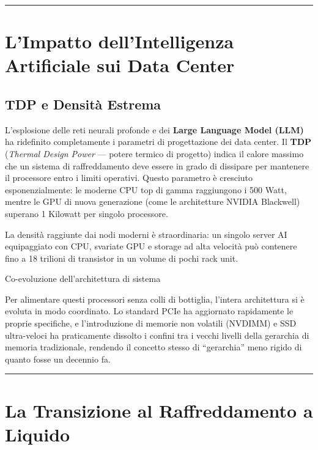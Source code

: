 \documentclass[
  italian,
  openany]{book}
\begin{document}
\begin{center}\rule{0.5\linewidth}{0.5pt}\end{center}

\section{L'Impatto dell'Intelligenza Artificiale sui Data
Center}\label{limpatto-dellintelligenza-artificiale-sui-data-center}

\subsection{TDP e Densità Estrema}\label{tdp-e-densituxe0-estrema}

L'esplosione delle reti neurali profonde e dei \textbf{Large Language
Model (LLM)} ha ridefinito completamente i parametri di progettazione
dei data center. Il \textbf{TDP} (\emph{Thermal Design Power} --- potere
termico di progetto) indica il calore massimo che un sistema di
raffreddamento deve essere in grado di dissipare per mantenere il
processore entro i limiti operativi. Questo parametro è cresciuto
esponenzialmente: le moderne CPU top di gamma raggiungono i 500 Watt,
mentre le GPU di nuova generazione (come le architetture NVIDIA
Blackwell) superano 1 Kilowatt per singolo processore.

La densità raggiunte dai nodi moderni è straordinaria: un singolo server
AI equipaggiato con CPU, svariate GPU e storage ad alta velocità può
contenere fino a 18 trilioni di transistor in un volume di pochi rack
unit.

\begin{calloutnote}{Co-evoluzione dell’architettura di sistema}

Per alimentare questi processori senza colli di bottiglia, l'intera
architettura si è evoluta in modo coordinato. Lo standard PCIe ha
aggiornato rapidamente le proprie specifiche, e l'introduzione di
memorie non volatili (NVDIMM) e SSD ultra-veloci ha praticamente
dissolto i confini tra i vecchi livelli della gerarchia di memoria
tradizionale, rendendo il concetto stesso di ``gerarchia'' meno rigido
di quanto fosse un decennio fa.

\end{calloutnote}

\begin{center}\rule{0.5\linewidth}{0.5pt}\end{center}

\section{La Transizione al Raffreddamento a
Liquido}\label{la-transizione-al-raffreddamento-a-liquido}
\end{document}
